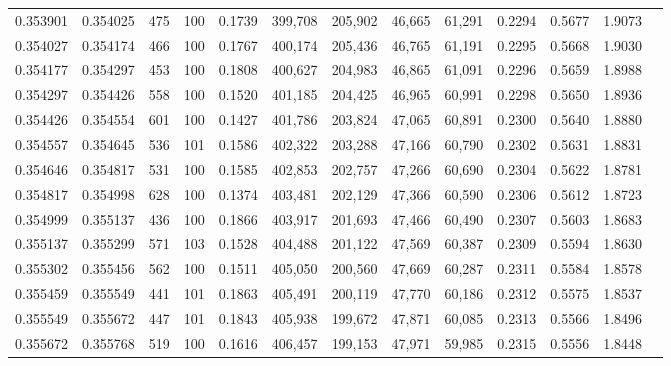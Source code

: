 \begin{tabular}{rrrrrrrrrrrrr}
0.353901 & 0.354025 &   475 & 100 &                                     0.1739 & 399,708 & 205,902 &  46,665 &  61,291 & 0.2294 & 0.5677 & 1.9073 \\
0.354027 & 0.354174 &   466 & 100 &                                     0.1767 & 400,174 & 205,436 &  46,765 &  61,191 & 0.2295 & 0.5668 & 1.9030 \\
0.354177 & 0.354297 &   453 & 100 &                                     0.1808 & 400,627 & 204,983 &  46,865 &  61,091 & 0.2296 & 0.5659 & 1.8988 \\
0.354297 & 0.354426 &   558 & 100 &                                     0.1520 & 401,185 & 204,425 &  46,965 &  60,991 & 0.2298 & 0.5650 & 1.8936 \\
0.354426 & 0.354554 &   601 & 100 &                                     0.1427 & 401,786 & 203,824 &  47,065 &  60,891 & 0.2300 & 0.5640 & 1.8880 \\
0.354557 & 0.354645 &   536 & 101 &                                     0.1586 & 402,322 & 203,288 &  47,166 &  60,790 & 0.2302 & 0.5631 & 1.8831 \\
0.354646 & 0.354817 &   531 & 100 &                                     0.1585 & 402,853 & 202,757 &  47,266 &  60,690 & 0.2304 & 0.5622 & 1.8781 \\
0.354817 & 0.354998 &   628 & 100 &                                     0.1374 & 403,481 & 202,129 &  47,366 &  60,590 & 0.2306 & 0.5612 & 1.8723 \\
0.354999 & 0.355137 &   436 & 100 &                                     0.1866 & 403,917 & 201,693 &  47,466 &  60,490 & 0.2307 & 0.5603 & 1.8683 \\
0.355137 & 0.355299 &   571 & 103 &                                     0.1528 & 404,488 & 201,122 &  47,569 &  60,387 & 0.2309 & 0.5594 & 1.8630 \\
0.355302 & 0.355456 &   562 & 100 &                                     0.1511 & 405,050 & 200,560 &  47,669 &  60,287 & 0.2311 & 0.5584 & 1.8578 \\
0.355459 & 0.355549 &   441 & 101 &                                     0.1863 & 405,491 & 200,119 &  47,770 &  60,186 & 0.2312 & 0.5575 & 1.8537 \\
0.355549 & 0.355672 &   447 & 101 &                                     0.1843 & 405,938 & 199,672 &  47,871 &  60,085 & 0.2313 & 0.5566 & 1.8496 \\
0.355672 & 0.355768 &   519 & 100 &                                     0.1616 & 406,457 & 199,153 &  47,971 &  59,985 & 0.2315 & 0.5556 & 1.8448 \\

\end{tabular}
